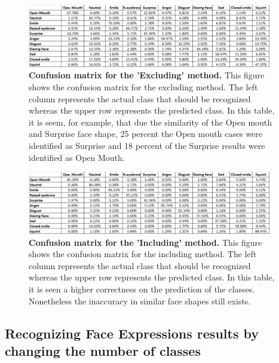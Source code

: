 \documentclass[]{article}
\begin{document}
\begin{figure}[ht]
\begin{center}
\vspace{-3mm}
\includegraphics[width=0.95\textwidth]{figures/confusionExcluding.jpg}
\end{center}
\caption{\textbf{Confusion matrix for the 'Excluding' method.} This figure shows
the confusion matrix for the excluding method. The left column represents the
actual class that should be recognized whereas the upper row represents the
predicted class. In this table, it is seem, for example, that due the similarity
of the Open mouth and Surprise face shape, 25 percent the Open mouth cases were
identified as Surprise and 18 percent of the Surprise results were identified as
Open Mouth.}
\label{coExcluding}
\end{figure}

\begin{figure}[ht]
\begin{center}
\vspace{-3mm}
\includegraphics[width=0.95\textwidth]{figures/confusionIncluding.jpg}
\end{center}
\caption{\textbf{Confusion matrix for the 'Including' method.} This figure 
shows the confusion matrix for the including method. The left column represents 
the actual class that should be recognized whereas the upper row represents the 
predicted class. In this table, it is seen a higher correctness on the
prediction  of the classes. Nonetheless the inaccuracy in similar face shapes
still exists. }
\label{coIncluding}
\end{figure}

 
\subsection{Recognizing Face Expressions results by changing the number of
classes}
\end{document}
